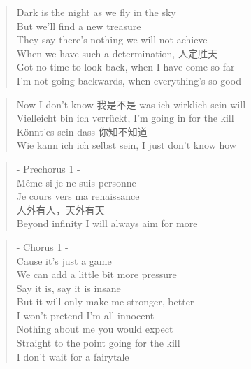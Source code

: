 
\begin{verse}
Dark is the night as we fly in the sky\\
But we'll find a new treasure\\
They say there's nothing we will not achieve\\
When we have such a determination, 人定胜天\\
Got no time to look back, when I have come so far\\
I'm not going backwards, when everything's so good
\end{verse}

\begin{verse}
Now I don't know 我是不是 was ich wirklich sein will\\
Vielleicht bin ich verrückt, I'm going in for the kill\\
Könnt'es sein dass 你知不知道\\
Wie kann ich ich selbst sein, I just don't know how
\end{verse}

\begin{verse}
- Prechorus 1 -\\
Même si je ne suis personne\\
Je cours vers ma renaissance\\
人外有人，天外有天\\
Beyond infinity I will always aim for more
\end{verse}

\begin{verse}
- Chorus 1 -\\
Cause it's just a game\\
We can add a little bit more pressure\\
Say it is, say it is insane\\
But it will only make me stronger, better\\
I won't pretend I'm all innocent\\
Nothing about me you would expect\\
Straight to the point going for the kill\\
I don't wait for a fairytale
\end{verse}

